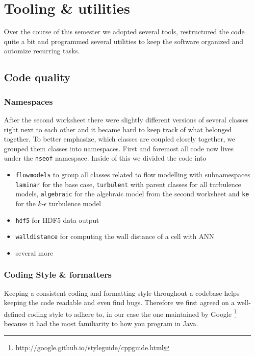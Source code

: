 \chapter{Tooling \& utilities}
\label{cha:tooling}

Over the course of this semester we adopted several tools, restructured the code
quite a bit and programmed several utilities to keep the software organized and
automize recurring tasks.

\section{Code quality}

\subsection{Namespaces}

After the second worksheet there were slightly different versions of several
classes right next to each other and it became hard to keep track of what
belonged together. To better emphasize, which classes are coupled closely
together, we grouped them classes into namespaces. First and foremost all code
now lives under the \texttt{nseof} namespace. Inside of this we divided the code
into

\begin{itemize}
\item \texttt{flowmodels} to group all classes related to flow modelling with
  subnamespaces \texttt{laminar} for the base case, \texttt{turbulent} with
  parent classes for all turbulence models, \texttt{algebraic} for the algebraic
  model from the second worksheet and \texttt{ke} for the $k$-$\epsilon$
  turbulence model
\item \texttt{hdf5} for HDF5 data output
\item \texttt{walldistance} for computing the wall distance of a cell with ANN
\item several more
\end{itemize}

\subsection{Coding Style \& formatters}

Keeping a consistent coding and formatting style throughout a codebase helps
keeping the code readable and even find bugs. Therefore we first agreed on a
well-defined coding style to adhere to, in our case the one maintained by Google
\footnote{http://google.github.io/styleguide/cppguide.html} because it had the
most familiarity to how you program in Java.

